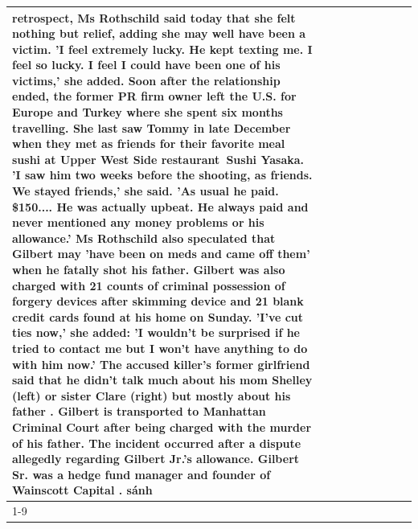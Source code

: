 \begin{table}[H]
\begin{tabular}{lllrlllll}
retrospect, Ms Rothschild said today that she felt nothing but relief, adding she may well have been a victim. 'I feel extremely lucky. He kept texting me. I feel so lucky. I feel I could have been one of his victims,' she added. Soon after the relationship ended, the former PR firm owner left the U.S. for Europe and Turkey where she spent six months  travelling. She last saw Tommy in late December when they met as friends for their favorite meal sushi at Upper West Side restaurant Sushi Yasaka. 'I saw him two weeks before the shooting, as friends. We stayed friends,' she said. 'As usual he paid. \$150.... He was actually upbeat. He always paid and never mentioned any money problems or his allowance.' Ms Rothschild also speculated that Gilbert may 'have been on meds and came off them' when he fatally shot his father. Gilbert was also charged with 21 counts of criminal possession of forgery devices after skimming device and 21 blank credit cards found at his home on Sunday. 'I've cut ties now,' she added: 'I wouldn’t be surprised if he tried to contact me but I won’t have anything to do with him now.' The accused killer's former girlfriend said that he didn't talk much about his mom Shelley (left) or sister Clare (right) but mostly about his father . Gilbert is transported to Manhattan Criminal Court  after being charged with the murder of his father. The incident occurred after a dispute allegedly regarding Gilbert Jr.'s allowance. Gilbert Sr. was a hedge fund manager and founder of Wainscott Capital . sánh \\
\cline{1-9} \cline{2-9}

\end{tabular}
\end{table}
